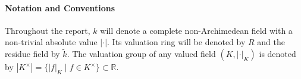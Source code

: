 \paragraph{Notation and Conventions}

Throughout the report, $k$ will denote a complete non-Archimedean field with a non-trivial absolute value $|\cdot|$.
Its valuation ring will be denoted by $R$ and the residue field by $\tilde{k}$. 
The valuation group of any valued field $(K, |\cdot|_K)$ is denoted by $|K^\times| = \{ |f|_{K} \; | \; f \in K^{\times} \} \subset \mathbb{R}$.
